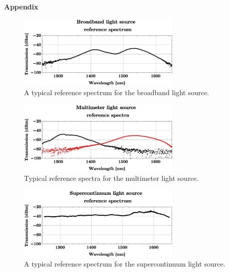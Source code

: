 
\textbf{Appendix}

\begin{figure}[H]
    \centering
    \includegraphics[width=0.7\textwidth]
    {fig/appendixrefplots/broadbandref.eps}
\vspace{-2mm}
    \caption{A typical reference spectrum for the broadband light source.}
    \label{fig:broadbandref}
\end{figure}

\vspace{-1.5cm}

\begin{figure}[H]
    \centering
    \includegraphics[width=0.7\textwidth]
    {fig/appendixrefplots/multimeterref.eps}
\vspace{-2mm}
    \caption{Typical reference spectra for the multimeter light source.}
    \label{fig:multimeterref}
\end{figure}

\vspace{-1.5cm}
\begin{figure}[H]
    \centering
    \includegraphics[width=0.7\textwidth]
    {fig/appendixrefplots/superKref.eps}
\vspace{-2mm}
    \caption{A typical reference spectrum for the supercontinuum light source.}
    \label{fig:superKref}
\end{figure}


